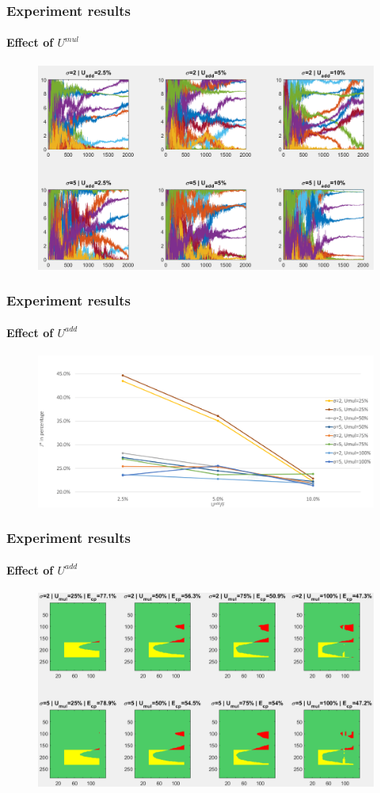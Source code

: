 \documentclass[fleqn]{beamer}
\begin{document}
\begin{frame}
	\frametitle{Experiment results}
	\framesubtitle{Effect of $U^{mul}$}
	\begin{figure}
		\centering
		\includegraphics[width=4.5in]{figures/results_figures/Umul/knobs_Umul_100_lambda_11.png}
	\end{figure}
\end{frame}


\begin{frame}
	\frametitle{Experiment results}
	\framesubtitle{Effect of $U^{add}$}
	\begin{figure}
		\centering
		\includegraphics[width=4.5in]{figures/Uadd.png}
	\end{figure}
\end{frame}

\begin{frame}
	\frametitle{Experiment results}
	\framesubtitle{Effect of $U^{add}$}
	\begin{figure}
		\centering
		\includegraphics[width=4.5in]{figures/results_figures/Uadd/cp_Uadd_25_lambda_11.png}
	\end{figure}
\end{frame}
\end{document}
